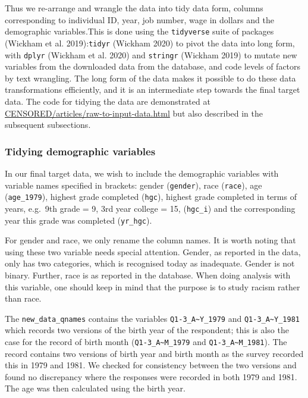 \documentclass{article}
\begin{document}
Thus we re-arrange and wrangle the data into tidy data form, columns corresponding to individual ID, year, job number, wage in dollars and the demographic variables.This is done using the \texttt{tidyverse} suite of packages (Wickham et al. 2019):\texttt{tidyr} (Wickham 2020) to pivot the data into long form, with \texttt{dplyr} (Wickham et al. 2020) and \texttt{stringr} (Wickham 2019) to mutate new variables from the downloaded data from the database, and code levels of factors by text wrangling. The long form of the data makes it possible to do these data transformations efficiently, and it is an intermediate step towards the final target data. The code for tidying the data are demonstrated at \url{CENSORED/articles/raw-to-input-data.html} but also described in the subsequent subsections.

\hypertarget{tidydemog}{%
\subsubsection{Tidying demographic variables}\label{tidydemog}}

In our final target data, we wish to include the demographic variables with variable names specified in brackets: gender (\texttt{gender}), race (\texttt{race}), age (\texttt{age\_1979}), highest grade completed (\texttt{hgc}), highest grade completed in terms of years, e.g.~9th grade = 9, 3rd year college = 15, (\texttt{hgc\_i}) and the corresponding year this grade was completed (\texttt{yr\_hgc}).

For gender and race, we only rename the column names. It is worth noting that using these two variable needs special attention. Gender, as reported in the data, only has two categories, which is recognised today as inadequate. Gender is not binary. Further, race is as reported in the database. When doing analysis with this variable, one should keep in mind that the purpose is to study racism rather than race.

The \texttt{new\_data\_qnames} contains the variables \texttt{Q1-3\_A\textasciitilde{}Y\_1979} and \texttt{Q1-3\_A\textasciitilde{}Y\_1981} which records two versions of the birth year of the respondent; this is also the case for the record of birth month (\texttt{Q1-3\_A\textasciitilde{}M\_1979} and \texttt{Q1-3\_A\textasciitilde{}M\_1981}). The record contains two versions of birth year and birth month as the survey recorded this in 1979 and 1981. We checked for consistency between the two versions and found no discrepancy where the responses were recorded in both 1979 and 1981. The age was then calculated using the birth year.
\end{document}
